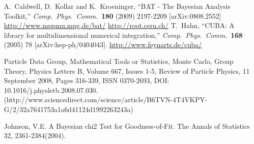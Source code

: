\documentclass[11pt, a4paper]{article}
\begin{document}









\begin{thebibliography}{99}
  A.~Caldwell, D.~Kollar and K.~Kroeninger, ``BAT - The Bayesian
  Analysis Toolkit,'' \textit{Comp.\ Phys.\ Comm.}\ {\bf 180} (2009) 2197-2209
  [arXiv:0808.2552]
  \url{http://www.mppmu.mpg.de/bat/}
%
  \url{http://root.cern.ch/}
%
  T.~Hahn, ``CUBA: A library for multidimensional numerical
  integration,'' \textit{Comp.\ Phys.\ Comm.}\ {\bf 168} (2005) 78
  [arXiv:hep-ph/0404043].
%
  \url{http://www.feynarts.de/cuba/}

Particle Data Group, Mathematical Tools or Statistics, Monte Carlo, Group Theory, Physics Letters B, Volume 667, Issues 1-5, Review of Particle Physics, 11 September 2008, Pages 316-339, ISSN 0370-2693, DOI: 10.1016/j.physletb.2008.07.030.
(http://www.sciencedirect.com/science/article/B6TVN-4T4VKPY-G/2/32a7641753a1a6d41124d1992263243a)

Johnson, V.E. A Bayesian chi2 Test for Goodness-of-Fit. The Annals of Statistics 32, 2361-2384(2004).

\end{thebibliography}

\end{document}
